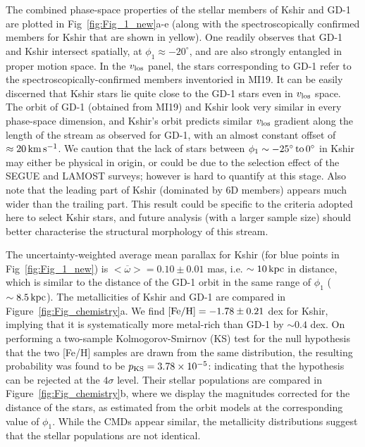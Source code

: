 \documentclass[apj]{emulateapj}
\def\kms{{\rm\,km\,s^{-1}}}
\def\kpc{{\rm\,kpc}}
\def\deg{^\circ}
\begin{document}
The combined phase-space properties of the stellar members of Kshir and GD-1 are plotted in Fig~\ref{fig:Fig_1_new}a-e (along with the spectroscopically confirmed members for Kshir that are shown in yellow). One readily observes that GD-1 and Kshir intersect spatially, at $\phi_1 \approx -20\deg$, and are also strongly entangled in proper motion space. In the $v_{\rm los}$ panel, the stars corresponding to GD-1 refer to the spectroscopically-confirmed members inventoried in MI19. It can be easily discerned that Kshir stars lie quite close to the GD-1 stars even in $v_{\rm los}$ space. The orbit of GD-1 (obtained from MI19) and Kshir look very similar in every phase-space dimension, and Kshir's orbit predicts similar $v_{\rm los}$ gradient along the length of the stream as observed for GD-1, with an almost constant offset of $\approx 20\kms$. We caution that the lack of stars between $\phi_1\sim-25\deg\,\rm{to}\,0\deg$ in Kshir may either be physical in origin, or could be due to the selection effect of the SEGUE and LAMOST surveys; however is hard to quantify at this stage. Also note that the leading part of Kshir (dominated by 6D members) appears much wider than the trailing part. This result could be specific to the criteria adopted here to select Kshir stars, and future analysis (with a larger sample size) should better characterise the structural morphology of this stream.

The uncertainty-weighted average mean parallax for Kshir (for blue points in Fig~\ref{fig:Fig_1_new}) is $<\overline{\mathbb{\omega}}>=0.10\pm 0.01$ mas, i.e. $\sim 10\kpc$ in distance, which is similar to the distance of the GD-1 orbit in the same range of $\phi_1$ ($\sim 8.5 \kpc$). The metallicities of Kshir and GD-1 are compared in Figure~\ref{fig:Fig_chemistry}a. We find ${\rm [Fe/H]}= -1.78\pm0.21$ dex for Kshir, implying that it is systematically more metal-rich than GD-1 by $\sim 0.4$ dex. On performing a two-sample Kolmogorov-Smirnov (KS) test for the null hypothesis that the two [Fe/H] samples are drawn from the same distribution, the resulting probability was found to be $p_{\rm KS}=3.78\times10^{-5}$: indicating that the hypothesis can be rejected at the $4\sigma$ level. Their stellar populations are compared in Figure~\ref{fig:Fig_chemistry}b, where we display the magnitudes corrected for the distance of the stars, as estimated from the orbit models at the corresponding value of $\phi_1$. While the CMDs appear similar, the metallicity distributions suggest that the stellar populations are not identical. 
\end{document}
